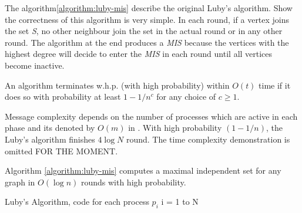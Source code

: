 The algorithm\ref{algorithm:luby-mis} describe the original Luby's algorithm. Show the correctness of this algorithm is very simple. In each round, if a vertex joins the set \textit{S}, no other neighbour join the set in the actual round or in any other round. The algorithm at the end produces a \textit{MIS} because the vertices with the highest degree will decide to enter the \textit{MIS} in each round until all vertices become inactive.



\begin{definition}

An algorithm terminates w.h.p. (with high probability) within $O(t)$ time if it does so with probability at least $1 − 1/n^c$ for any choice of $c ≥ 1$.

\end{definition}

 Message complexity depends on the number of processes which are active in each phase and its denoted by $O(m)$ in \cite{luby1986simple}. With high probability $(1-1/n)$, the Luby's algorithm finishes  $4\log N$ round. The time complexity demonstration is omitted FOR THE MOMENT.

\begin{theorem}

Algorithm \ref{algorithm:luby-mis} computes a maximal independent set for any graph  in $O(\log n)$  rounds with high probability.

\end{theorem}


\begin{algorithm}
 \caption{Luby's Algorithm, code for each process $p_i$ i = 1 to N}
 \label{algorithm:luby-mis} 

\SetAlgoNoLine
{}
\end{algorithm} 



